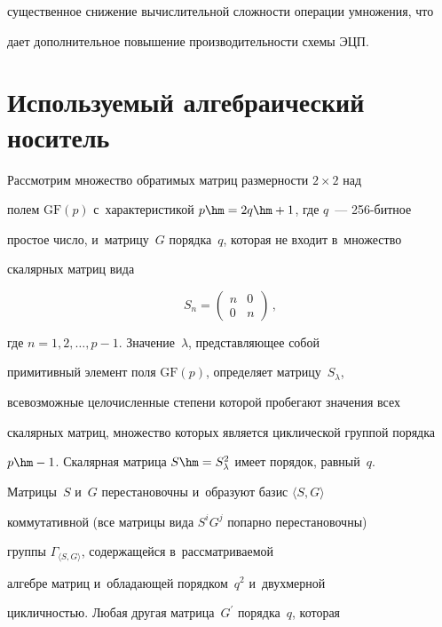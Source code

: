 существенное снижение вычислительной сложности операции умножения, что 


дает дополнительное повышение производительности схемы ЭЦП.


   


\section{Используемый алгебраический носитель}


 


   Рассмотрим множество обратимых матриц размерности $2\times2$ над 


полем $\mathrm{GF}(p)$ с~характеристикой $p\hm=2q\hm+1$, где $q$~--- 256-бит\-ное 


простое число, и~мат\-ри\-цу~$G$ порядка~$q$, которая не входит в~множество 


скалярных матриц вида 


   $$


   S_n=\begin{pmatrix}


   n & 0\\


   0 & n


   \end{pmatrix}\,,


   $$


где $n=1,2,\ldots , p-1$. Значение~$\lambda$, представляющее собой 


примитивный элемент поля $\mathrm{GF}(p)$, определяет матрицу~$S_\lambda$, 


всевозможные целочисленные степени которой пробегают значения всех 


скалярных матриц, множество которых является циклической группой порядка 


$p\hm-1$. Скалярная матрица $S\hm= S_\lambda^2$ имеет порядок, равный~$q$. 


Мат\-ри\-цы~$S$ и~$G$ перестановочны и~образуют базис $\langle S, G\rangle$ 


коммутативной (все мат\-ри\-цы вида $S^i G^j$ попарно перестановочны) 


группы $\Gamma_{\langle S, G\rangle}$, содержащейся в~рас\-смат\-ри\-ва\-емой  


ал\-геб\-ре матриц и~обладающей порядком~$q^2$ и~двухмерной 


 ци\-клич\-ностью. Любая другая матрица~$G^\prime$ порядка~$q$, которая 


